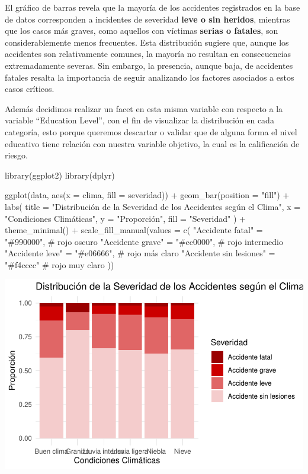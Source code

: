 \documentclass[
  letterpaper,
  DIV=11,
  numbers=noendperiod]{scrartcl}
\newenvironment{Shaded}{\begin{snugshade}}{\end{snugshade}}
\newcommand{\AttributeTok}[1]{\textcolor[rgb]{0.40,0.45,0.13}{#1}}
\newcommand{\CommentTok}[1]{\textcolor[rgb]{0.37,0.37,0.37}{#1}}
\newcommand{\FunctionTok}[1]{\textcolor[rgb]{0.28,0.35,0.67}{#1}}
\newcommand{\NormalTok}[1]{\textcolor[rgb]{0.00,0.23,0.31}{#1}}
\newcommand{\OtherTok}[1]{\textcolor[rgb]{0.00,0.23,0.31}{#1}}
\newcommand{\SpecialCharTok}[1]{\textcolor[rgb]{0.37,0.37,0.37}{#1}}
\newcommand{\StringTok}[1]{\textcolor[rgb]{0.13,0.47,0.30}{#1}}
\begin{document}
El gráfico de barras revela que la mayoría de los accidentes registrados
en la base de datos corresponden a incidentes de severidad \textbf{leve
o sin heridos}, mientras que los casos más graves, como aquellos con
víctimas \textbf{serias o fatales}, son considerablemente menos
frecuentes. Esta distribución sugiere que, aunque los accidentes son
relativamente comunes, la mayoría no resultan en consecuencias
extremadamente severas. Sin embargo, la presencia, aunque baja, de
accidentes fatales resalta la importancia de seguir analizando los
factores asociados a estos casos críticos.

Además decidimos realizar un facet en esta misma variable con respecto a
la variable ``Education Level'', con el fin de visualizar la
distribución en cada categoría, esto porque queremos descartar o validar
que de alguna forma el nivel educativo tiene relación con nuestra
variable objetivo, la cual es la calificación de riesgo.

\begin{Shaded}
\begin{Highlighting}[]
\FunctionTok{library}\NormalTok{(ggplot2)}
\FunctionTok{library}\NormalTok{(dplyr)}


\FunctionTok{ggplot}\NormalTok{(data, }\FunctionTok{aes}\NormalTok{(}\AttributeTok{x =}\NormalTok{ clima, }\AttributeTok{fill =}\NormalTok{ severidad)) }\SpecialCharTok{+}
  \FunctionTok{geom\_bar}\NormalTok{(}\AttributeTok{position =} \StringTok{"fill"}\NormalTok{) }\SpecialCharTok{+} 
  \FunctionTok{labs}\NormalTok{(}
    \AttributeTok{title =} \StringTok{"Distribución de la Severidad de los Accidentes según el Clima"}\NormalTok{,}
    \AttributeTok{x =} \StringTok{"Condiciones Climáticas"}\NormalTok{,}
    \AttributeTok{y =} \StringTok{"Proporción"}\NormalTok{,}
    \AttributeTok{fill =} \StringTok{"Severidad"}
\NormalTok{  ) }\SpecialCharTok{+}
  \FunctionTok{theme\_minimal}\NormalTok{() }\SpecialCharTok{+}
  \FunctionTok{scale\_fill\_manual}\NormalTok{(}\AttributeTok{values =} \FunctionTok{c}\NormalTok{(}
    \StringTok{"Accidente fatal"} \OtherTok{=} \StringTok{"\#990000"}\NormalTok{,        }\CommentTok{\# rojo oscuro}
    \StringTok{"Accidente grave"} \OtherTok{=} \StringTok{"\#cc0000"}\NormalTok{,      }\CommentTok{\# rojo intermedio}
    \StringTok{"Accidente leve"} \OtherTok{=} \StringTok{"\#e06666"}\NormalTok{,        }\CommentTok{\# rojo más claro}
    \StringTok{"Accidente sin lesiones"} \OtherTok{=} \StringTok{"\#f4cccc"}    \CommentTok{\# rojo muy claro}
\NormalTok{  ))}
\end{Highlighting}
\end{Shaded}

\includegraphics{cod_bitacora2_files/figure-pdf/unnamed-chunk-8-1.pdf}
\end{document}
